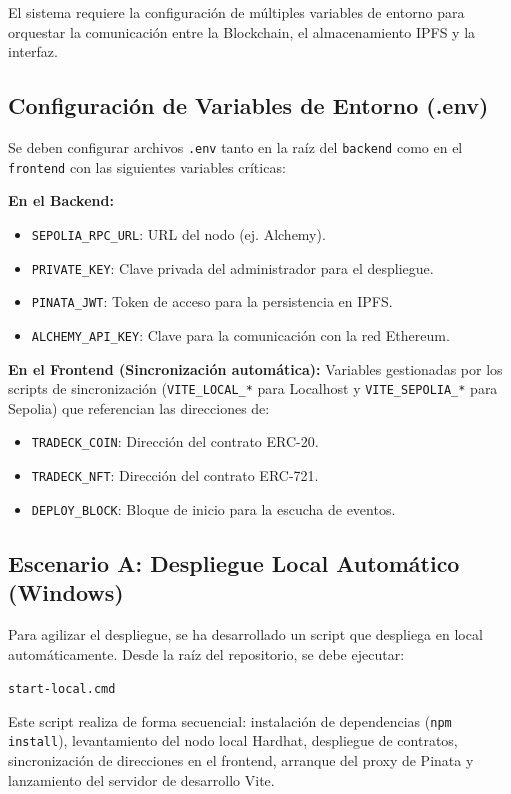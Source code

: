 El sistema requiere la configuración de múltiples variables de entorno para orquestar la comunicación entre la Blockchain, el almacenamiento IPFS y la interfaz.

\subsection{Configuración de Variables de Entorno (.env)}
Se deben configurar archivos \texttt{.env} tanto en la raíz del \texttt{backend} como en el \texttt{frontend} con las siguientes variables críticas:

\textbf{En el Backend:}
\begin{itemize}
	\item \texttt{SEPOLIA\_RPC\_URL}: URL del nodo (ej. Alchemy).
	\item \texttt{PRIVATE\_KEY}: Clave privada del administrador para el despliegue.
	\item \texttt{PINATA\_JWT}: Token de acceso para la persistencia en IPFS.
	\item \texttt{ALCHEMY\_API\_KEY}: Clave para la comunicación con la red Ethereum.
\end{itemize}

\textbf{En el Frontend (Sincronización automática):}
Variables gestionadas por los scripts de sincronización (\texttt{VITE\_LOCAL\_*} para Localhost y \texttt{VITE\_SEPOLIA\_*} para Sepolia) que referencian las direcciones de:
\begin{itemize}
	\item \texttt{TRADECK\_COIN}: Dirección del contrato ERC-20.
	\item \texttt{TRADECK\_NFT}: Dirección del contrato ERC-721.
	\item \texttt{DEPLOY\_BLOCK}: Bloque de inicio para la escucha de eventos.
\end{itemize}

\subsection{Escenario A: Despliegue Local Automático (Windows)}
Para agilizar el despliegue, se ha desarrollado un script que despliega en local automáticamente. Desde la raíz del repositorio, se debe ejecutar:
\begin{center}
	\texttt{start-local.cmd}
\end{center}
Este script realiza de forma secuencial: instalación de dependencias (\texttt{npm install}), levantamiento del nodo local Hardhat, despliegue de contratos, sincronización de direcciones en el frontend, arranque del proxy de Pinata y lanzamiento del servidor de desarrollo Vite. 

